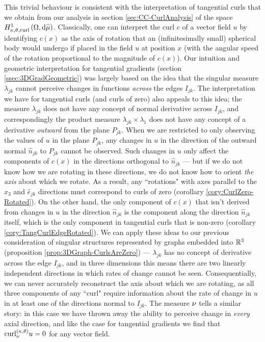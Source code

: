 This trivial behaviour is consistent with the interpretation of tangential curls that we obtain from our analysis in section \ref{sec:CC-CurlAnalysis} of the space $H^1_{\kappa,\theta,\mathrm{curl}}\left( \Omega, \mathrm{d}\widetilde{\mu} \right)$.
Classically, one can interpret the curl $c$ of a vector field $u$ by identifying $c(x)$ as the axis of rotation that an (infinitesimally small) spherical body would undergo if placed in the field $u$ at position $x$ (with the angular speed of the rotation proportional to the magnitude of $c(x)$).
Our intuition and geometric interpretation for tangential gradients (section \ref{ssec:3DGradGeometric}) was largely based on the idea that the singular measure $\lambda_{jk}$ cannot perceive changes in functions \emph{across} the edges $I_{jk}$.
The interpretation we have for tangential curls (and curls of zero) also appeals to this idea; the measure $\lambda_{jk}$ does not have any concept of normal derivative across $I_{jk}$, and correspondingly the product measure $\lambda_{jk}\times\lambda_1$ does not have any concept of a derivative \emph{outward} from the plane $P_{jk}$.
When we are restricted to only observing the values of $u$ in the plane $P_{jk}$, any changes in $u$ in the direction of the outward normal $\widehat{n}_{jk}$ to $P_{jk}$ cannot be observed.
Such changes in $u$ only affect the components of $c(x)$ in the directions orthogonal to $\widehat{n}_{jk}$ --- but if we do not know how we are rotating in these directions, we do not know how to orient \emph{the axis} about which we rotate.
As a result, any ``rotations" with axes parallel to the $\widehat{x}_3$ and $\widehat{e}_{jk}$ directions must correspond to curls of zero (corollary \ref{cory:CurlZero-Rotated}).
On the other hand, the only component of $c(x)$ that isn't derived from changes in $u$ in the direction $\widehat{n}_{jk}$ is the component along the direction $\widehat{n}_{jk}$ itself, which is the only component in tangential curls that is non-zero (corollary \ref{cory:TangCurlEdgeRotated}).
We can apply these ideas to our previous consideration of singular structures represented by graphs embedded into $\mathbb{R}^3$ (proposition \ref{prop:3DGraph-CurlsAreZero}) ---  $\lambda_{jk}$ has no concept of derivative across the edge $I_{jk}$, and in three dimensions this means there are two linearly independent directions in which rates of change cannot be seen.
Consequentially, we can never accurately reconstruct the axis about which we are rotating, as all three components of any ``curl" require information about the rate of change in $u$ in at least one of the directions normal to $I_{jk}$.
The measure $\nu$ tells a similar story: in this case we have thrown away the ability to perceive change in \emph{every} axial direction, and like the case for tangential gradients we find that $\mathrm{curl}_{\nu}^{\left( \kappa, \theta \right)}u=0$ for any vector field.

